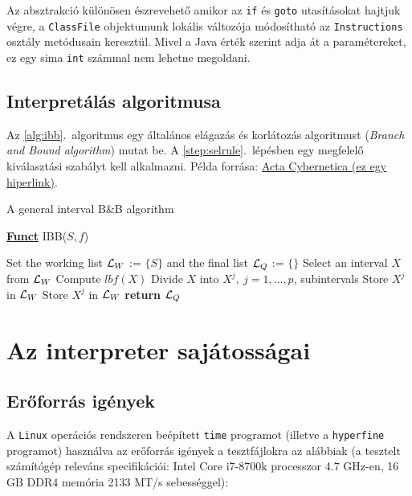 Az absztrakció különösen észrevehető amikor az \lstinline{if} és \lstinline{goto} utasításokat hajtjuk végre, a \lstinline{ClassFile} objektumunk lokális változója módosítható az \lstinline{Instructions} osztály metódusain keresztül. Mivel a Java érték szerint adja át a paramétereket, ez egy sima \lstinline{int} számmal nem lehetne megoldani.

\subsection{Interpretálás algoritmusa}

Az \ref{alg:ibb}.~algoritmus egy általános elágazás és korlátozás algoritmust (\emph{Branch and Bound algorithm}) mutat be. A \ref{step:selrule}.~lépésben egy megfelelő kiválasztási szabályt kell alkalmazni.
Példa forrása: \href{https://www.inf.u-szeged.hu/actacybernetica/}{Acta Cybernetica (ez egy hiperlink)}.

\begin{algorithm}[H]
\caption{A general interval B\&B algorithm}
\label{alg:ibb}
\textbf{\underline{Funct}} IBB($S,f$)
\begin{algorithmic}[1] %
\State Set the working list ${\cal L}_W$ := $\{S\}$ and the final list ${\cal L}_Q$ := $\{\}$
 \label{alg:igoend}
	\State Select an interval $X$ from ${\cal L}_W$ \label{step:selrule}
	\State Compute $lbf(X)$ 
	 
		\State Divide $X$ into $X^j,\ j=1,\dots, p$, subintervals   
			 
				\State Store $X^j$ in ${\cal L}_W$
			\Else
				\State Store $X^j$ in ${\cal L}_W$
			\EndIf
		\EndFor
	\EndIf
\EndWhile
\State \textbf{return} ${\cal L}_Q$
\end{algorithmic}
\end{algorithm}

\section{Az interpreter sajátosságai}

\subsection{Erőforrás igények}

A \lstinline{Linux} operációs rendszeren beépített \lstinline{time} programot (illetve a \lstinline{hyperfine} programot) használva az erőforrás igények a tesztfájlokra az alábbiak (a tesztelt számítógép releváns specifikációi: Intel Core i7-8700k processzor 4.7 GHz-en, 16 GB DDR4 memória 2133 MT/s sebességgel):

